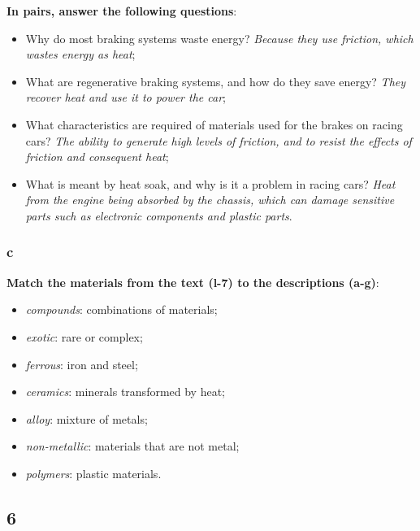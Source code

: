 \textbf{In pairs, answer the following questions}:

\begin{itemize}

\item Why do most braking systems waste energy? \textit{Because they use friction, which wastes energy as heat};

\item What are regenerative braking systems, and how do they save energy? \textit{They recover heat and use it to power the car};

\item What characteristics are required of materials used for the brakes on racing cars? \textit{The ability to generate high levels of friction, and to resist the effects of friction and consequent heat};

\item What is meant by heat soak, and why is it a problem in racing cars? \textit{Heat from the engine being absorbed by the chassis, which can damage sensitive parts such as electronic components and plastic parts}.

\end{itemize}

\subsubsection{c}

\textbf{Match the materials from the text (l-7) to the descriptions (a-g)}:

\begin{itemize}

\item \textit{compounds}: combinations of materials;
\item \textit{exotic}: rare or complex;
\item \textit{ferrous}: iron and steel;
\item \textit{ceramics}: minerals transformed by heat;
\item \textit{alloy}: mixture of metals;
\item \textit{non-metallic}: materials that are not metal;
\item \textit{polymers}: plastic materials.

\end{itemize}

\subsection{6}

